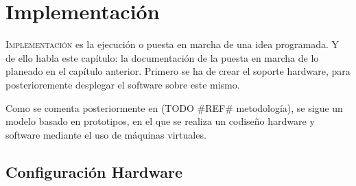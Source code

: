 \chapter{Implementación}
\label{chap:implementacion}

\lettrine{I}{mplementación} es la ejecución o puesta en marcha de una idea programada. Y de ello habla este capítulo: la documentación de la puesta en marcha de lo planeado en el capítulo anterior. Primero se ha de crear el soporte hardware, para posterioremente desplegar el software sobre este mismo.

Como se comenta posteriormente en (TODO \#REF\# metodología), se sigue un modelo basado en prototipos, en el que se realiza un codiseño hardware y software mediante el uso de máquinas virtuales.

\section{Configuración Hardware}
\label{sec:impl_infra_hardware}
